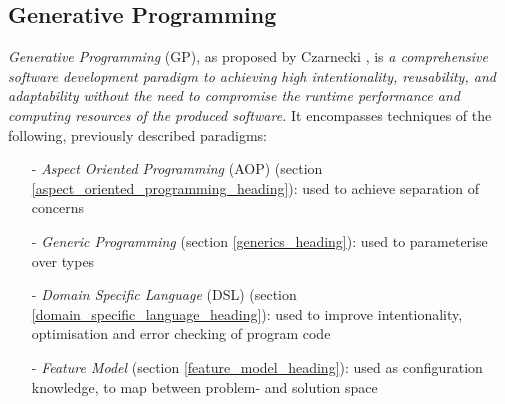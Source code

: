 %
%
%
%
%
%
%

\subsection{Generative Programming}
\label{generative_programming_heading}

\emph{Generative Programming} (GP), as proposed by Czarnecki \cite{czarnecki},
is \textit{a comprehensive software development paradigm to achieving high
intentionality, reusability, and adaptability without the need to compromise
the runtime performance and computing resources of the produced software.} It
encompasses techniques of the following, previously described paradigms:

\begin{itemize}
    \item[-] \emph{Aspect Oriented Programming} (AOP) (section
        \ref{aspect_oriented_programming_heading}): used to achieve separation
        of concerns
    \item[-] \emph{Generic Programming} (section \ref{generics_heading}): used
        to parameterise over types
    \item[-] \emph{Domain Specific Language} (DSL) (section
        \ref{domain_specific_language_heading}): used to improve
        intentionality, optimisation and error checking of program code
    \item[-] \emph{Feature Model} (section \ref{feature_model_heading}): used
        as configuration knowledge, to map between problem- and solution space
\end{itemize}

